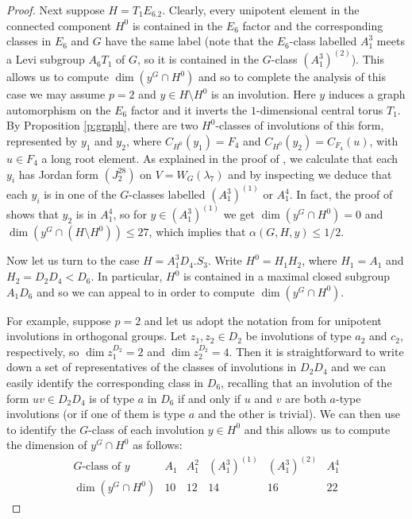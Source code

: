 \documentclass[twoside,a4paper,reqno,11pt]{amsart}
\renewcommand{\a}{\alpha}
\renewcommand{\l}{\lambda}
\newcommand{\<}{\langle}
\renewcommand{\>}{\rangle}
\newcommand{\leqs}{\leqslant}
\renewcommand{\:}{\colon}
\theoremstyle{plain}
\theoremstyle{definition}
\begin{document}
\begin{proof}
Next suppose $H = T_1E_6.2$. Clearly, every unipotent element in the connected component $H^0$ is contained in the $E_6$ factor and the corresponding classes in $E_6$ and $G$ have the same label (note that the $E_6$-class labelled $A_1^3$
meets a Levi subgroup $A_6T_1$ of $G$, so it is contained in the $G$-class $(A_1^3)^{(2)}$). This allows us to compute $\dim(y^G \cap H^0)$ and so to complete the analysis of this case we may assume $p=2$ and $y \in H \setminus H^0$ is an involution. Here $y$ induces a graph automorphism on the $E_6$ factor and it inverts the $1$-dimensional central torus $T_1$. By Proposition \ref{p:graph}, there are two $H^0$-classes of involutions of this form, represented by $y_1$ and $y_2$, where $C_{H^0}(y_1) = F_4$ and $C_{H^0}(y_2) = C_{F_4}(u)$, with $u \in F_4$ a long root element. As explained in the proof of \cite[Lemma 4.1]{LLS1}, we calculate that each $y_i$ has Jordan form $(J_2^{28})$ on $V = W_G(\l_7)$ and by inspecting \cite[Table 7]{Law1} we deduce that each $y_i$ is in one of the $G$-classes labelled $(A_1^3)^{(1)}$ or $A_1^4$. In fact, the proof of \cite[Lemma 4.1]{LLS1} shows that $y_2$ is in $A_1^4$, so for $y \in (A_1^3)^{(1)}$ we get $\dim(y^G \cap H^0) = 0$ and $\dim(y^G \cap (H \setminus H^0)) \leqs 27$, which implies that $\a(G,H,y) \leqs 1/2$.  

Now let us turn to the case $H = A_1^3D_4.S_3$. Write $H^0 = H_1H_2$, where $H_1 = A_1$ and $H_2 = D_2D_4<D_6$. In particular, $H^0$ is contained in a maximal closed subgroup $A_1D_6$ and so we can appeal to \cite[Section 4.10]{Law2} in order to compute $\dim(y^G \cap H^0)$. 

For example, suppose $p=2$ and let us adopt the notation from \cite{AS} for unipotent involutions in orthogonal groups. Let $z_1,z_2 \in D_2$ be involutions of type $a_2$ and $c_2$, respectively, so $\dim z_1^{D_2} = 2$ and $\dim z_2^{D_2} = 4$. Then  it is straightforward to write down a set of representatives of the classes of involutions in $D_2D_4$ and we can easily identify the corresponding class in $D_6$, recalling that an involution of the form $uv \in D_2D_4$ is of type $a$ in $D_6$ if and only if $u$ and $v$ are both $a$-type involutions (or if one of them is type $a$ and the other is trivial). We can then use \cite[Section 4.10]{Law2} to identify the $G$-class of each involution $y \in H^0$ and this allows us to compute the dimension of $y^G \cap H^0$ as follows:
\[
\begin{array}{l|ccccc}
\mbox{$G$-class of $y$} & A_1 & A_1^2 & (A_1^3)^{(1)} & (A_1^3)^{(2)} & A_1^4 \\ \hline 
\dim(y^G \cap H^0) & 10 & 12 & 14 & 16 & 22 
\end{array}
\]


\end{proof}
\end{document}
